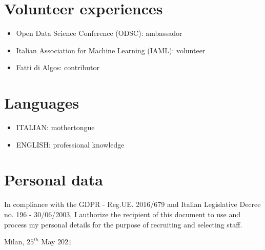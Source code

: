 \documentclass[11pt,a4paper,sans]{moderncv}        %
\begin{document}
\section{Volunteer experiences}
\begin{itemize}
 \item Open Data Science Conference (ODSC): ambassador
 \item Italian Association for Machine Learning (IAML): volunteer
 \item Fatti di Algos: contributor
\end{itemize} 

\section{Languages}
\begin{itemize}
\item ITALIAN: mothertongue
\item ENGLISH: professional knowledge
\end{itemize} 

\section{Personal data}
In compliance with the GDPR - Reg.UE. 2016/679 and Italian Legislative Decree no. 196 - 30/06/2003, I authorize the recipient of this document to use and process my personal details for the purpose of recruiting and selecting staff. 

\bigskip
\bigskip
Milan, $25^{th}$ May $2021$
\end{document}
